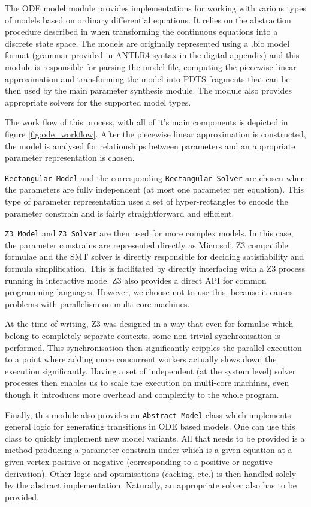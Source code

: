 The ODE model module provides implementations for working with various types of models based on ordinary differential equations. It relies on the abstraction procedure described in \cite{abs, absOverview} when transforming the continuous equations into a discrete state space. The models are originally represented using a .bio model format (grammar provided in ANTLR4 syntax in the digital appendix) and this module is responsible for parsing the model file, computing the piecewise linear approximation and transforming the model into \ac{PDTS} fragments that can be then used by the main parameter synthesis module. The module also provides appropriate solvers for the supported model types.	

The work flow of this process, with all of it's main components is depicted in figure \ref{fig:ode_workflow}. After the piecewise linear approximation is constructed, the model is analysed for relationships between parameters and an appropriate parameter representation is chosen.

\texttt{Rectangular Model} and the corresponding \texttt{Rectangular Solver} are chosen when the parameters are fully independent (at most one parameter per equation). This type of parameter representation uses a set of hyper-rectangles to encode the parameter constrain and is fairly straightforward and efficient.

\texttt{Z3 Model} and \texttt{Z3 Solver} are then used for more complex models. In this case, the parameter constrains are represented directly as Microsoft Z3 compatible formulae and the SMT solver is directly responsible for deciding satisfiability and formula simplification. This is facilitated by directly interfacing with a Z3 process running in interactive mode. Z3 also provides a direct API for common programming languages. However, we choose not to use this, because it causes problems with parallelism on multi-core machines. 

At the time of writing, Z3 was designed in a way that even for formulae which belong to completely separate contexts, some non-trivial synchronisation is performed. This synchronisation then significantly cripples the parallel execution to a point where adding more concurrent workers actually slows down the execution significantly. Having a set of independent (at the system level) solver processes then enables us to scale the execution on multi-core machines, even though it introduces more overhead and complexity to the whole program.

Finally, this module also provides an \texttt{Abstract Model} class which implements general logic for generating transitions in ODE based models. One can use this class to quickly implement new model variants. All that needs to be provided is a method producing a parameter constrain under which is a given equation at a given vertex positive or negative (corresponding to a positive or negative derivation). Other logic and optimisations (caching, etc.) is then handled solely by the abstract implementation. Naturally, an appropriate solver also has to be provided.

